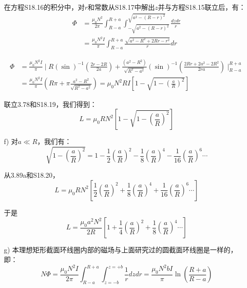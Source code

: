 在方程S18.16的积分中，对$r$和常数从S18.17中解出$z$并与方程S18.15联立后，有：
\begin{equation}%
\begin{split}
\Phi&=\frac{\mu_0N^2}{2\pi}\int_{R-a}^{R+a}\int_{-\sqrt{a^2-(R-r)^2}}^{\sqrt{a^2-(R-r)^2}}\frac{dzdr}{r}\\
&=\frac{\mu_0N^2I}{\pi}\int_{R-a}^{R+a}\frac{\sqrt{a^2-R^2+2Rr-r^2}}{r}dr
\end{split}
\end{equation}

\begin{equation}%
\begin{split}
\Phi&=\frac{\mu_0N^2I}{\pi}\mid R(\sin)^{-1}(\frac{2r-2R}{2a})+\frac{(a^2-R^2)}{\sqrt{R^2-a^2}}(\sin)^{-1}(\frac{2Rr+2a^2-2R^2}{2ra})\mid_{R-a}^{R+a} \\
&=\frac{\mu_0N^2I}{\pi}(R\pi+\pi\frac{a^2-R^2}{\sqrt{R^2-a^2}})=\mu_0N^2RI[1-\sqrt{1-(\frac{a}{R})^2}]
\end{split}
\end{equation}

联立3.78和S18.19，我们得到：
 \begin{equation}%
L=\mu_0RN^2\left[1-\sqrt{1-\left(\frac{a}{R}\right)^2}\right]
\end{equation}

f) 对$a\ll R$，我们有：
\begin{equation}%
\sqrt{1-\left(\frac{a}{R}\right)^2}=1-\frac{1}{2}(\frac{a}{R})^2-\frac{1}{8}(\frac{a}{R})^4-\frac{1}{16}(\frac{a}{R})^6\cdots
\end{equation}

从3.89a和S18.20，
\begin{equation}
L=\mu_0RN^2\left[\frac{1}{2}(\frac{a}{R})^2+\frac{1}{8}(\frac{a}{R})^4+\frac{1}{16}(\frac{a}{R})^6\cdots\right]
\end{equation}

于是
 \begin{equation}%
L=\frac{\mu_0a^2N^2}{2R}\left[1+\frac{1}{4}(\frac{a}{R})^2+\frac{1}{8}(\frac{a}{R})^4\cdots\right]
\end{equation}

g) 本理想矩形截面环线圈内部的磁场与上面研究过的圆截面环线圈是一样的，即：
 \begin{equation}%
N\Phi=\frac{\mu_0N^2I}{2\pi}\int_{R-a}^{R+a}\int_{z=-b}^{z=+b}\frac{1}{r}dzdr
=\frac{\mu_0N^2bI}{\pi}\ln\left(\frac{R+a}{R-a}\right)
\end{equation}

